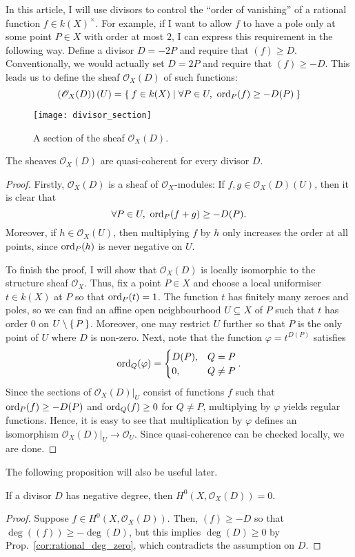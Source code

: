 In this article, I will use divisors to control the ``order of vanishing'' of
a rational function $f\in k(X)^{\times}$. For example, if I want to allow 
$f$ to have a pole only at some point $P\in X$ with order at most $2$,
I can express this requirement in the following way. Define a divisor
$D=-2P$ and require that $(f)\geq D$. Conventionally, we would actually
set $D=2P$ and require that $(f)\geq -D$. This leads us to define the
sheaf $\mathscr{O}_X(D)$ of such functions:
\[
  \left(\mathscr{O}_X(D)\right)(U)=\Set{f\in k(X)\mid
  \forall P\in U,\ \operatorname{ord}_{P}(f)\geq -D(P)}
\]
\begin{figure}[H]
  \centering
  \texttt{[image: divisor\_section]}
  \caption{A section of the sheaf $\mathscr{O}_X(D)$.}
\end{figure}
\begin{prop}
  The sheaves $\mathscr{O}_X(D)$ are quasi-coherent for every divisor $D$.
\end{prop}
\begin{proof}
  Firstly, $\mathscr{O}_X(D)$ is a sheaf of $\mathscr{O}_{X}$-modules:
  If $f, g\in\mathscr{O}_X(D)(U)$, then it is clear that
  \[
    \forall P\in U,\ \ord_{P}(f+g)\geq -D(P).
  \]
  Moreover, if $h\in\mathscr{O}_{X}(U)$, then multiplying $f$ by $h$ only
  increases the order at all points, since $\operatorname{ord}_{P}(h)$ is never negative
  on $U$.

  To finish the proof, I will show that $\mathscr{O}_{X}(D)$ is locally
  isomorphic to the structure sheaf $\mathscr{O}_{X}$. Thus, fix a point
  $P\in X$ and choose a local uniformiser $t\in k(X)$ at $P$
  so that $\operatorname{ord}_{P}(t)=1$. The function $t$
  has finitely many zeroes and poles, so we can find an affine open
  neighbourhood $U\subseteq X$ of $P$ such that $t$ has order 0 on
  $U\setminus\set{P}$. Moreover, one may restrict $U$ further so that
  $P$ is the only point of $U$ where $D$ is non-zero. Next, note that
  the function $\varphi=t^{D(P)}$ satisfies
  \[
    \operatorname{ord}_{Q}(\varphi)
    =\begin{cases}
      D(P),&Q=P\\0,&Q\neq P
    \end{cases}.
  \]
  Since the sections of $\mathscr{O}_{X}(D)\vert_{U}$ consist of functions $f$
  such that $\operatorname{ord}_{P}(f)\geq -D(P)$ and $\operatorname{ord}_{Q}(f)\geq 0$ for $Q\neq P$,
  multiplying by $\varphi$ yields regular functions. Hence, it is easy to see
  that multiplication by $\varphi$ defines an isomorphism
  $\mathscr{O}_X(D)\vert_{U}\to \mathscr{O}_{U}$. Since quasi-coherence can
  be checked locally, we are done.
\end{proof}
The following proposition will also be useful later.
\begin{prop}\label{prop:global_sec_negative_divisor}
  If a divisor $D$ has negative degree, then $H^{0}(X,\mathscr{O}_X(D))=0$.
\end{prop}
\begin{proof}
  Suppose $f\in H^{0}(X,\mathscr{O}_X(D))$. Then, $(f)\geq -D$
  so that $\deg((f))\geq -\deg(D)$, but this implies $\deg(D)\geq 0$
  by Prop.~\ref{cor:rational_deg_zero}, which contradicts the assumption on
  $D$.
\end{proof}

